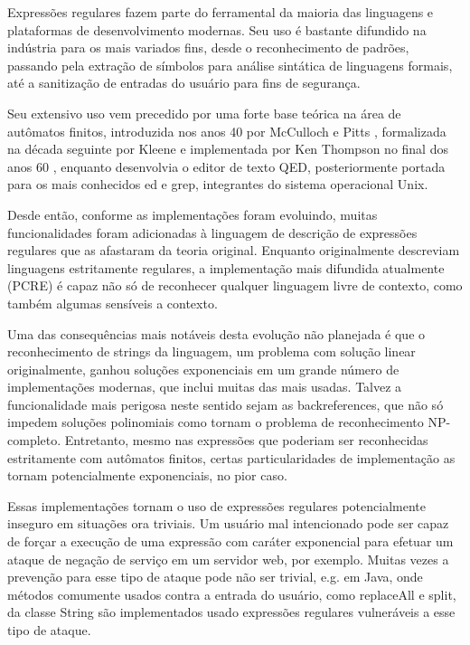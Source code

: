 \documentclass[a4paper,12pt,oneside,onecolumn]{uerj}
\begin{document}
Expressões regulares fazem parte do ferramental da maioria das linguagens e plataformas de desenvolvimento modernas. Seu uso é bastante difundido na indústria para os mais variados fins, desde o reconhecimento de padrões, passando pela extração de símbolos para análise sintática de linguagens formais, até a sanitização de entradas do usuário para fins de segurança.

Seu extensivo uso vem precedido por uma forte base teórica na área de autômatos finitos, introduzida nos anos 40 por McCulloch e Pitts \cite{bib:McCulloch43}, formalizada na década seguinte por Kleene \cite{bib:Kleene56} e implementada por Ken Thompson no final dos anos 60 \cite{bib:Thompson68}, enquanto desenvolvia o editor de texto QED, posteriormente portada para os mais conhecidos ed e grep, integrantes do sistema operacional Unix.

Desde então, conforme as implementações foram evoluindo, muitas funcionalidades foram adicionadas à linguagem de descrição de expressões regulares que as afastaram da teoria original. Enquanto originalmente descreviam linguagens estritamente regulares, a implementação mais difundida atualmente (PCRE) é capaz não só de reconhecer qualquer linguagem livre de contexto, como também algumas sensíveis a contexto. \cite{bib:Nikita12}

Uma das consequências mais notáveis desta evolução não planejada é que o reconhecimento de strings da linguagem, um problema com solução linear originalmente, ganhou soluções exponenciais em um grande número de implementações modernas, que inclui muitas das mais usadas. Talvez a funcionalidade mais perigosa neste sentido sejam as backreferences, que não só impedem soluções polinomiais como tornam o problema de reconhecimento NP-completo. Entretanto, mesmo nas expressões que poderiam ser reconhecidas estritamente com autômatos finitos, certas particularidades de implementação as tornam potencialmente exponenciais, no pior caso. \cite{bib:Cox07}

Essas implementações tornam o uso de expressões regulares potencialmente inseguro em situações ora triviais. Um usuário mal intencionado pode ser capaz de forçar a execução de uma expressão com caráter exponencial para efetuar um ataque de negação de serviço em um servidor web, por exemplo. Muitas vezes a prevenção para esse tipo de ataque pode não ser trivial, e.g. em Java, onde métodos comumente usados contra a entrada do usuário, como replaceAll e split, da classe String são implementados usado expressões regulares vulneráveis a esse tipo de ataque.
\end{document}
